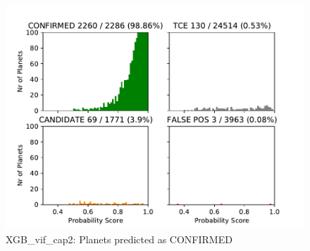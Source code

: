 
\begin{figure}[H]
                \begin{mdframed}[linecolor=green]
                \centering
                \includegraphics[width = 1\textwidth,height=.4\textheight]{data/XGB_vif_cap2_pred_confirm.pdf}
                \caption{XGB\_vif\_cap2: Planets predicted as CONFIRMED}
                \label{fig:data/XGB_vif_cap2_pred_confirm}
                \end{mdframed}
                \end{figure}
